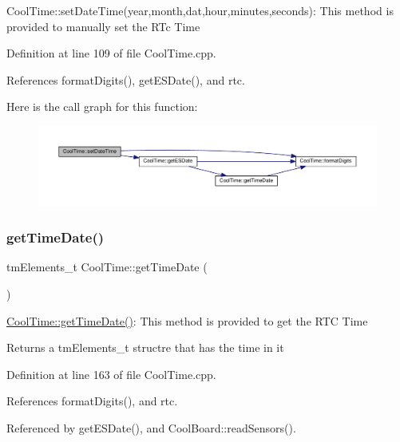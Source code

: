 Cool\+Time\+::set\+Date\+Time(year,month,dat,hour,minutes,seconds)\+: This method is provided to manually set the R\+Tc Time 

Definition at line 109 of file Cool\+Time.\+cpp.



References format\+Digits(), get\+E\+S\+Date(), and rtc.

Here is the call graph for this function\+:
\nopagebreak
\begin{figure}[H]
\begin{center}
\leavevmode
\includegraphics[width=350pt]{d6/d49/class_cool_time_ab81ea7fdaace111aa01cc1ec84c6d297_cgraph}
\end{center}
\end{figure}
\mbox{\label{class_cool_time_a7a7501c5ca77dd1248bea704c44f986c}} 
\subsubsection{\texorpdfstring{get\+Time\+Date()}{getTimeDate()}}
{\footnotesize\ttfamily tm\+Elements\+\_\+t Cool\+Time\+::get\+Time\+Date (\begin{DoxyParamCaption}{ }\end{DoxyParamCaption})}

\hyperlink{class_cool_time_a7a7501c5ca77dd1248bea704c44f986c}{Cool\+Time\+::get\+Time\+Date()}\+: This method is provided to get the R\+TC Time

\begin{DoxyReturn}{Returns}
a tm\+Elements\+\_\+t structre that has the time in it 
\end{DoxyReturn}


Definition at line 163 of file Cool\+Time.\+cpp.



References format\+Digits(), and rtc.



Referenced by get\+E\+S\+Date(), and Cool\+Board\+::read\+Sensors().

